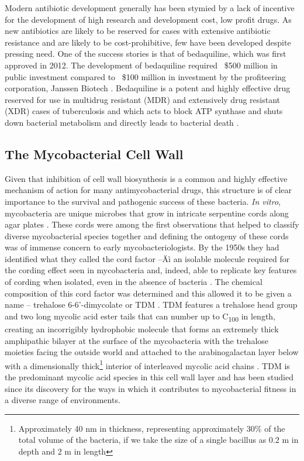 Modern antibiotic development generally has been stymied by a lack of incentive for the development of high research and development cost, low profit drugs. As new antibiotics are likely to be reserved for cases with extensive antibiotic resistance and are likely to be cost-prohibitive, few have been developed despite pressing need. One of the success stories is that of bedaquiline, which was first approved in 2012. The development of bedaquiline required ~\$500 million in public investment compared to ~\$100 million in investment by the profiteering corporation, Janssen Biotech \citep{Gotham2020, Leibert2014, Osborne2013}. Bedaquiline is a potent and highly effective drug reserved for use in multidrug resistant (MDR) and extensively drug resistant (XDR) cases of tuberculosis and which acts to block ATP synthase and shuts down bacterial metabolism and directly leads to bacterial death \citep{Nguyen2018, Sarathy2019}. 

\subsection{The Mycobacterial Cell Wall}\label{cellwall}

Given that inhibition of cell wall biosynthesis is a common and highly effective mechanism of action for many antimycobacterial drugs, this structure is of clear importance to the survival and pathogenic success of these bacteria. \textit{In vitro}, mycobacteria are unique microbes that grow in intricate serpentine cords along agar plates \citep{Koch1882, Glickman2000}. These cords were among the first observations that helped to classify diverse mycobacterial species together and defining the ontogeny of these cords was of immense concern to early mycobacteriologists. By the 1950s they had identified what they called the cord factor --Äì an isolable molecule required for the cording effect seen in mycobacteria and, indeed, able to replicate key features of cording when isolated, even in the absence of bacteria \citep{Bloch1955, Bloch1953, Sorkin1952, Hunter2006, Behling1993}. The chemical composition of this cord factor was determined and this allowed it to be given a name -- trehalose 6-6'-dimycolate or TDM \citep{Noll1955}. TDM features a trehalose head group and two long mycolic acid ester tails that can number up to C\textsubscript{100} in length, creating an incorrigibly hydrophobic molecule that forms an extremely thick amphipathic bilayer at the surface of the mycobacteria with the trehalose moieties facing the outside world and attached to the arabinogalactan layer below with a dimensionally thick\footnote{Approximately 40 nm in thickness, representing approximately 30\% of the total volume of the bacteria, if we take the size of a single bacillus as 0.2 \textmu m in depth and 2 \textmu m in length} interior of interleaved mycolic acid chains \citep{Glickman2008, Welsh2013, BandalMutalik2014, Adhyapak2020}. TDM is the predominant mycolic acid species in this cell wall layer and has been studied since its discovery for the ways in which it contributes to mycobacterial fitness in a diverse range of environments.

